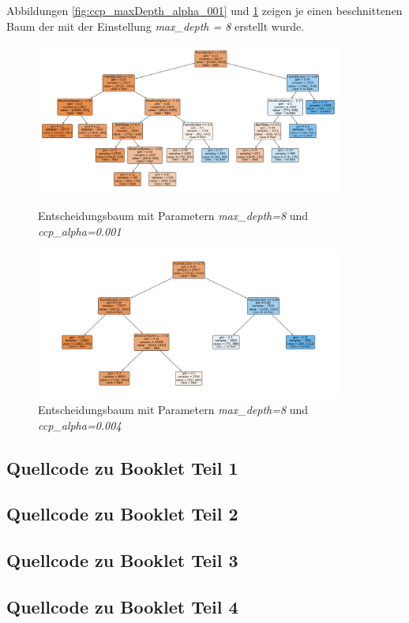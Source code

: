 Abbildungen \ref{fig:ccp_maxDepth_alpha_001} und \ref{fig:ccp_maxDepth_alpha_004} zeigen je einen beschnittenen Baum der mit der Einstellung \emph{max\_depth = 8} erstellt wurde.
\begin{figure}[H]
    \centering
     \begin{minipage}{0.45\textwidth}
        \centering
        \includegraphics[width=0.9\textwidth]{Bilder/ccp_maxDepth_alpha_001.png}
        \caption{Entscheidungsbaum mit Parametern \emph{max\_depth=8} und \emph{ccp\_alpha=0.001}}
        \label{fig:ccp_maxDepth_alpha_001}
    \end{minipage}\hfill
    \begin{minipage}{0.45\textwidth}
        \centering
        \includegraphics[width=0.9\textwidth]{Bilder/ccp_maxdepth_alpha_004.png}
        \caption{Entscheidungsbaum mit Parametern \emph{max\_depth=8} und \emph{ccp\_alpha=0.004}}
        \label{fig:ccp_maxDepth_alpha_004}
    \end{minipage}\hfill
\end{figure}
\pagebreak
\subsection{Quellcode zu Booklet Teil 1}
\pagebreak
\subsection{Quellcode zu Booklet Teil 2}
\pagebreak
\subsection{Quellcode zu Booklet Teil 3}
\pagebreak
\subsection{Quellcode zu Booklet Teil 4}